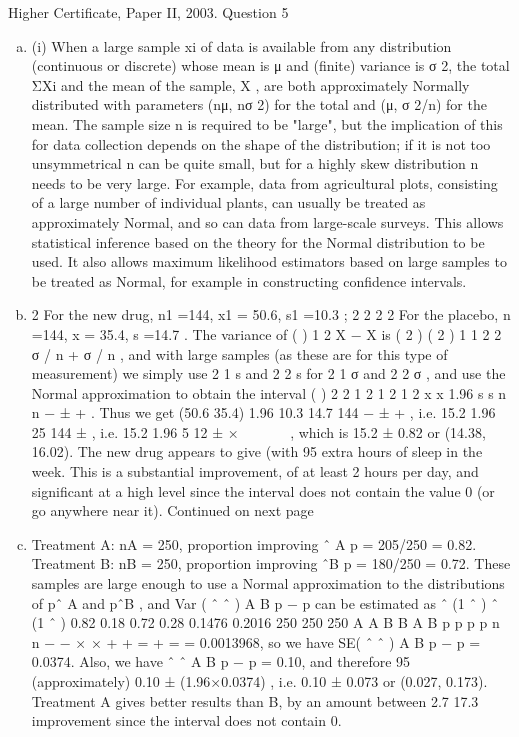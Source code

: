 \documentclass[a4paper,12pt]{article}
\begin{document}
Higher Certificate, Paper II, 2003. Question 5
\begin{enumerate}[(a)]
\item (i) When a large sample {xi} of data is available from any distribution
(continuous or discrete) whose mean is μ and (finite) variance is σ 2, the total
ΣXi and the mean of the sample, X , are both approximately Normally
distributed with parameters (nμ, nσ 2) for the total and (μ, σ 2/n) for the mean.
The sample size n is required to be "large", but the implication of this for data
collection depends on the shape of the distribution; if it is not too
unsymmetrical n can be quite small, but for a highly skew distribution n needs
to be very large.
For example, data from agricultural plots, consisting of a large number of
individual plants, can usually be treated as approximately Normal, and so can
data from large-scale surveys. This allows statistical inference based on the
theory for the Normal distribution to be used. It also allows maximum
likelihood estimators based on large samples to be treated as Normal, for
example in constructing confidence intervals.
\item  2
For the new drug, n1 =144, x1 = 50.6, s1 =10.3 ;
2
2 2 2 For the placebo, n =144, x = 35.4, s =14.7 .
The variance of ( ) 1 2 X − X is ( 2 ) ( 2 )
1 1 2 2 σ / n + σ / n , and with large samples (as
these are for this type of measurement) we simply use 2
1 s and 2
2 s for 2
1 σ and
2
2 σ , and use the Normal approximation to obtain the interval
( )
2 2
1 2
1 2
1 2
x x 1.96 s s
n n
− ± + .
Thus we get
(50.6 35.4) 1.96 10.3 14.7
144
− ± + ,
i.e. 15.2 1.96 25
144
± , i.e. 15.2 1.96 5
12
± ×   
 
,
which is 15.2 ± 0.82 or (14.38, 16.02).
The new drug appears to give (with 95%
extra hours of sleep in the week. This is a substantial improvement, of at least
2 hours per day, and significant at a high level since the interval does not
contain the value 0 (or go anywhere near it).
Continued on next page
\item  Treatment A: nA = 250, proportion improving ˆ A p = 205/250 = 0.82.
Treatment B: nB = 250, proportion improving ˆB p = 180/250 = 0.72.
These samples are large enough to use a Normal approximation to the
distributions of pˆ A and pˆB , and Var ( ˆ ˆ ) A B p − p can be estimated as
ˆ (1 ˆ ) ˆ (1 ˆ ) 0.82 0.18 0.72 0.28 0.1476 0.2016
250 250 250
A A B B
A B
p p p p
n n
− − × × + + = + =
= 0.0013968, so we have SE( ˆ ˆ ) A B p − p = 0.0374.
Also, we have ˆ ˆ A B p − p = 0.10, and therefore 95%
(approximately)
0.10 ± (1.96×0.0374) , i.e. 0.10 ± 0.073 or (0.027, 0.173).
Treatment A gives better results than B, by an amount between 2.7%
17.3%
improvement since the interval does not contain 0.

\end{enumerate}
\end{document}
